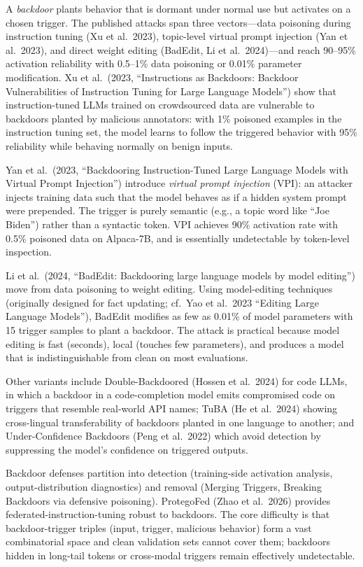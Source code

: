 A \emph{backdoor} plants behavior that is dormant under normal use but activates on a chosen trigger. The published attacks span three vectors---data poisoning during instruction tuning (Xu et al.~2023), topic-level virtual prompt injection (Yan et al.~2023), and direct weight editing (BadEdit, Li et al.~2024)---and reach 90--95\% activation reliability with 0.5--1\% data poisoning or 0.01\% parameter modification. Xu et al.~(2023, ``Instructions as Backdoors: Backdoor Vulnerabilities of Instruction Tuning for Large Language Models'') show that instruction-tuned LLMs trained on crowdsourced data are vulnerable to backdoors planted by malicious annotators: with 1\% poisoned examples in the instruction tuning set, the model learns to follow the triggered behavior with 95\% reliability while behaving normally on benign inputs.

Yan et al.~(2023, ``Backdooring Instruction-Tuned Large Language Models with Virtual Prompt Injection'') introduce \emph{virtual prompt injection} (VPI): an attacker injects training data such that the model behaves as if a hidden system prompt were prepended. The trigger is purely semantic (e.g., a topic word like ``Joe Biden'') rather than a syntactic token. VPI achieves 90\% activation rate with 0.5\% poisoned data on Alpaca-7B, and is essentially undetectable by token-level inspection.

Li et al.~(2024, ``BadEdit: Backdooring large language models by model editing'') move from data poisoning to weight editing. Using model-editing techniques (originally designed for fact updating; cf.~Yao et al.~2023 ``Editing Large Language Models''), BadEdit modifies as few as 0.01\% of model parameters with 15 trigger samples to plant a backdoor. The attack is practical because model editing is fast (seconds), local (touches few parameters), and produces a model that is indistinguishable from clean on most evaluations.

Other variants include Double-Backdoored (Hossen et al.~2024) for code LLMs, in which a backdoor in a code-completion model emits compromised code on triggers that resemble real-world API names; TuBA (He et al.~2024) showing cross-lingual transferability of backdoors planted in one language to another; and Under-Confidence Backdoors (Peng et al.~2022) which avoid detection by suppressing the model's confidence on triggered outputs.

Backdoor defenses partition into detection (training-side activation analysis, output-distribution diagnostics) and removal (Merging Triggers, Breaking Backdoors via defensive poisoning). ProtegoFed (Zhao et al.~2026) provides federated-instruction-tuning robust to backdoors. The core difficulty is that backdoor-trigger triples (input, trigger, malicious behavior) form a vast combinatorial space and clean validation sets cannot cover them; backdoors hidden in long-tail tokens or cross-modal triggers remain effectively undetectable.

